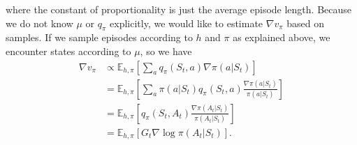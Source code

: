 \documentclass[a4paper]{article}
\begin{document}
where the constant of proportionality is just the average episode length.
%
Because we do not know $\mu$ or $q_{\pi}$ explicitly, we would like to estimate
$\nabla v_{\pi}$ based on samples. If we sample episodes according to $h$ and
$\pi$ as explained above, we encounter states according to $\mu$, so we have
\begin{subequations}
\begin{align}
  \nabla v_{\pi} &\propto \mathbb{E}_{h, \pi} \left[ \sum_{a} q_{\pi}(S_{t}, a) \nabla\pi(a | S_{t}) \right] \\
  &= \mathbb{E}_{h, \pi} \left[ \sum_{a} \pi(a | S_{t}) q_{\pi}(S_{t}, a) \frac{\nabla \pi(a | S_{t})}{\pi(a | S_{t})} \right] \\
  &= \mathbb{E}_{h, \pi} \left[ q_{\pi}(S_{t}, A_{t}) \frac{\nabla \pi(A_{t} | S_{t})}{\pi(A_{t}| S_{t})} \right] \\
  &= \mathbb{E}_{h, \pi} \left[ G_{t} \nabla \log \pi(A_{t} | S_{t}) \right] .
  \label{eq:estimator1}
\end{align}
\end{subequations}
\end{document}
